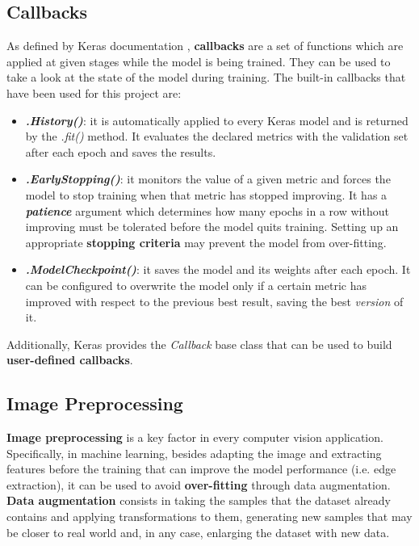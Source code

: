 \subsection{Callbacks} \label{subsec:callbacks}
As defined by Keras documentation \cite{chollet2015keras}, \textbf{callbacks} are a set of functions which are applied at given stages while the model is being trained. They can be used to take a look at the state of the model during training. The built-in callbacks that have been used for this project are:
\begin{itemize}
	\item \textbf{\textit{.History()}}: it is automatically applied to every Keras model and is returned by the \textit{.fit()} method. It evaluates the declared metrics with the validation set after each epoch and saves the results.
	
	\item \textbf{\textit{.EarlyStopping()}}: it monitors the value of a given metric and forces the model to stop training when that metric has stopped improving. It has a \textbf{\textit{patience}} argument which determines how many epochs in a row without improving must be tolerated before the model quits training. Setting up an appropriate \textbf{stopping criteria} may prevent the model from over-fitting.
	
	\item \textbf{\textit{.ModelCheckpoint()}}: it saves the model and its weights after each epoch. It can be configured to overwrite the model only if a certain metric has improved with respect to the previous best result, saving the best \textit{version} of it.
\end{itemize}

Additionally, Keras provides the \textit{Callback} base class that can be used to build \textbf{user-defined callbacks}.

\subsection{Image Preprocessing}
\textbf{Image preprocessing} is a key factor in every computer vision application. Specifically, in machine learning, besides adapting the image and extracting features before the training that can improve the model performance (i.e. edge extraction), it can be used to avoid \textbf{over-fitting} through data augmentation. \textbf{Data augmentation} consists in taking the samples that the dataset already contains and applying transformations to them, generating new samples that may be closer to real world and, in any case, enlarging the dataset with new data.

